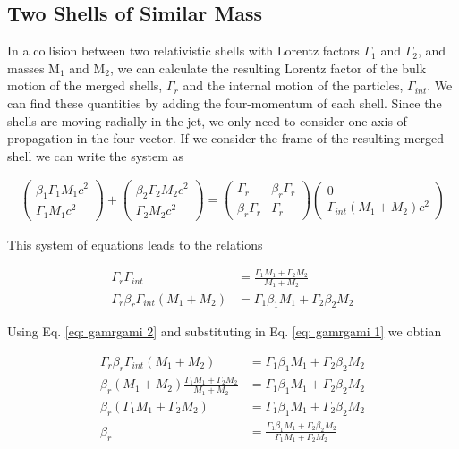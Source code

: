 \documentclass[linenumbers,twocolumn]{aastex631}
\begin{document}
\begin{appendix}
\subsection{Two Shells of Similar Mass}

In a collision between two relativistic shells with Lorentz factors $\Gamma_1$ and $\Gamma_2$, and masses M$_1$ and M$_2$, we can calculate the resulting Lorentz factor of the bulk motion of the merged shells, $\Gamma_r$ and the internal motion of the particles, $\Gamma_{int}$. We can find these quantities by adding the four-momentum of each shell. Since the shells are moving radially in the jet, we only need to consider one axis of propagation in the four vector. If we consider the frame of the resulting merged shell we can write the system as

\begin{align}
	\begin{pmatrix}
	\beta_1\Gamma_1 M_1 c^2\\
	\Gamma_1 M_1 c^2
	\end{pmatrix}
	+
	\begin{pmatrix}
	\beta_2\Gamma_2 M_2 c^2 \\
	\Gamma_2 M_2 c^2
	\end{pmatrix}
	=
	\begin{pmatrix}
	\Gamma_r & \beta_r\Gamma_r\\
	\beta_r\Gamma_r & \Gamma_r
	\end{pmatrix}
	\begin{pmatrix}
	0 \\
	\Gamma_{int}(M_1 + M_2) c^2
	\end{pmatrix}
\end{align}

This system of equations leads to the relations

\begin{align}
	\Gamma_r \Gamma_{int} &= \frac{\Gamma_1M_1 + \Gamma_2M_2}{M_1+M_2} \label{eq: gamrgami 1}\\
	\Gamma_r\beta_r\Gamma_{int}(M_1+M_2) &= \Gamma_1\beta_1M_1+\Gamma_2\beta_2M_2 \label{eq: gamrgami 2}
\end{align}

Using Eq. \ref{eq: gamrgami 2} and substituting in Eq. \ref{eq: gamrgami 1} we obtian

\begin{align}
	\Gamma_r\beta_r\Gamma_{int}(M_1+M_2) &= \Gamma_1\beta_1M_1+\Gamma_2\beta_2M_2 \\
	\beta_r(M_1+M_2) \frac{\Gamma_1M_1 + \Gamma_2M_2}{M_1+M_2} &= \Gamma_1\beta_1M_1+\Gamma_2\beta_2M_2 \\
	\beta_r (\Gamma_1M_1 + \Gamma_2M_2) &= \Gamma_1\beta_1M_1+\Gamma_2\beta_2M_2 \\
	\beta_r &= \frac{\Gamma_1\beta_1M_1+\Gamma_2\beta_2M_2}{\Gamma_1M_1 + \Gamma_2M_2}
\end{align}


\end{appendix}
\end{document}

